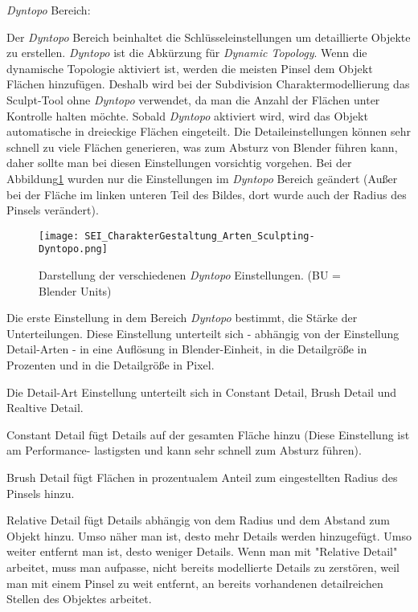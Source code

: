 \textit{Dyntopo} Bereich\citep{blender:dyn_top}:

Der \textit{Dyntopo} Bereich beinhaltet die Schlüsseleinstellungen um detaillierte Objekte zu erstellen.
\textit{Dyntopo} ist die Abkürzung für \textit{Dynamic Topology}. Wenn die dynamische Topologie aktiviert ist,
werden die meisten Pinsel dem Objekt Flächen hinzufügen. Deshalb wird bei der Subdivision Charaktermodellierung
das Sculpt-Tool ohne \textit{Dyntopo} verwendet, da man die Anzahl der Flächen unter Kontrolle halten möchte.
Sobald \textit{Dyntopo} aktiviert wird, wird das Objekt automatische in dreieckige Flächen eingeteilt.
Die Detaileinstellungen können sehr schnell zu viele Flächen generieren, was zum Absturz von Blender führen kann,
daher sollte man bei diesen Einstellungen vorsichtig vorgehen. Bei der Abbildung\ref{picture:dynTopo} wurden nur die
Einstellungen im \textit{Dyntopo} Bereich geändert (Außer bei der Fläche im linken unteren Teil des Bildes, dort
wurde auch der Radius des Pinsels verändert).

\begin{figure}[h]
    \centering
    \texttt{[image: SEI\_CharakterGestaltung\_Arten\_Sculpting-Dyntopo.png]}
    \caption{Darstellung der verschiedenen \textit{Dyntopo} Einstellungen. (BU = Blender Units)}
    \label{picture:dynTopo}
\end{figure}

Die erste Einstellung in dem Bereich \textit{Dyntopo} bestimmt, die Stärke der Unterteilungen. Diese Einstellung
unterteilt sich - abhängig von der Einstellung Detail-Arten - in eine Auflösung in Blender-Einheit, in die
Detailgröße in Prozenten und in die Detailgröße in Pixel.

Die Detail-Art Einstellung unterteilt sich in Constant Detail, Brush Detail und Realtive Detail.

Constant Detail fügt Details auf der gesamten Fläche hinzu (Diese Einstellung ist am Performance-
lastigsten und kann sehr schnell zum Absturz führen).

Brush Detail fügt Flächen in prozentualem Anteil zum eingestellten Radius des Pinsels hinzu.

Relative Detail fügt Details abhängig von dem Radius und dem Abstand zum Objekt
hinzu. Umso näher man ist, desto mehr Details werden hinzugefügt. Umso weiter entfernt man ist, desto
weniger Details. Wenn man mit "Relative Detail" arbeitet, muss man aufpasse, nicht bereits modellierte Details
zu zerstören, weil man mit einem Pinsel zu weit entfernt, an bereits vorhandenen detailreichen Stellen des
Objektes arbeitet.

